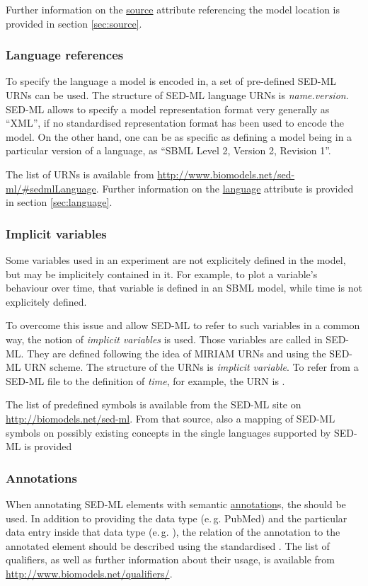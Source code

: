 Further information on the \hyperref[sec:source]{source} attribute referencing the model location is provided in section \ref{sec:source}.

\subsubsection{Language references}
\label{sec:languageURI}
To specify the language a model is encoded in, a set of pre-defined SED-ML URNs can be used. 
The structure of SED-ML language URNs is \emph{name.version}. 
SED-ML allows to specify a model representation format very generally as ``XML'', if no standardised representation format has been used to encode the model. On the other hand, one can be as specific as defining
a model being in a particular version of a language, as ``SBML Level 2, Version 2, Revision 1''.

The list of URNs is available from \url{http://www.biomodels.net/sed-ml/#sedmlLanguage}. 
Further information on the \hyperref[sec:language]{language} attribute is provided in section \ref{sec:language}.

\subsubsection{Implicit variables}
\label{sec:implicitVariable}

Some variables used in an experiment are not explicitely defined in the model, but may be implicitely contained in it. 
For example, to plot a variable's behaviour over time, that variable is defined in an SBML model, while time is not explicitely defined. 

To overcome this issue and allow SED-ML to refer to such variables in a common way, the notion of \emph{implicit variables} is used.
Those variables are called  in SED-ML. They are defined following the idea of MIRIAM URNs and using the SED-ML URN scheme. The structure of the URNs is \emph{implicit variable}.
To refer from a SED-ML file to the definition of \emph{time}, for example, the URN is .

The list of predefined symbols is available from the SED-ML site on \url{http://biomodels.net/sed-ml}.
From that source, also a mapping of SED-ML symbols on possibly existing concepts in the single languages supported by SED-ML is provided

\subsubsection{Annotations}
\label{sec:annotations}
When annotating SED-ML elements with semantic \hyperref[class:annotation]{annotation}s, the  should be used. In addition to providing the data type (e.\,g. PubMed) and the particular data entry inside that data type (e.\,g. ), the relation of the annotation to the annotated element should be described using the standardised . The list of qualifiers, as well as further information about their usage, is available from \url{http://www.biomodels.net/qualifiers/}.

